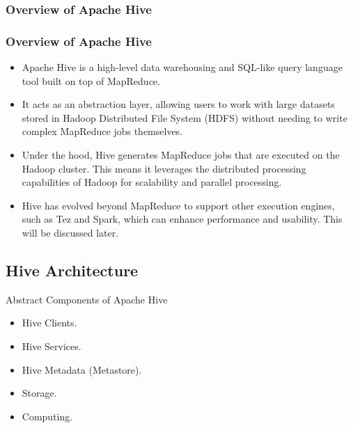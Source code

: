 \subsubsection{Overview of Apache Hive}
\begin{frame}
\frametitle{Overview of Apache Hive}
\begin{itemize} 
	\item Apache Hive is a high-level data warehousing and SQL-like query language tool built on top of MapReduce.\pause
	\item It acts as an abstraction layer, allowing users to work with large datasets stored in Hadoop Distributed File System (HDFS) without needing to write complex MapReduce jobs themselves.\pause
	\item Under the hood, Hive generates MapReduce jobs that are executed on the Hadoop cluster. This means it leverages the distributed processing capabilities of Hadoop for scalability and parallel processing.\pause
	\item Hive has evolved beyond MapReduce to support other execution engines, such as Tez and Spark, which can enhance performance and usability. This will be discussed later.\pause

\end{itemize}
\end{frame}


\subsection{Hive Architecture}

\begin{frame}{Abstract Components of Apache Hive}
	\begin{itemize}
		\item Hive Clients.
		\item Hive Services.
		\item Hive Metadata (Metastore).
		\item Storage.
		\item Computing.
	\end{itemize}
	\end{frame}
	
